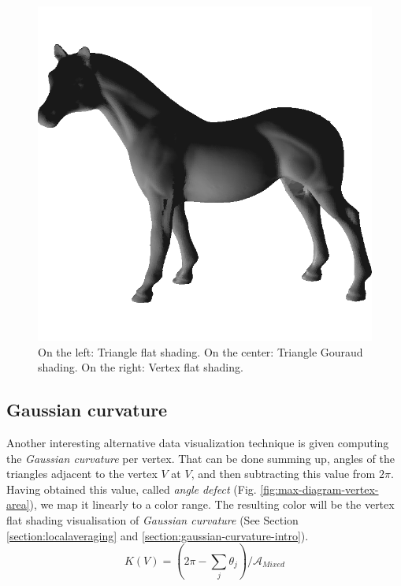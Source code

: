 \begin{figure}[!h]
    \endminipage\hfill
    \centering
    \includegraphics[scale=0.39]{images/horse-efs.png}
    \endminipage\hfill
    \caption{On the left: Triangle flat shading. On the center: Triangle Gouraud shading. On the right: Vertex flat shading.}
    \label{fig:comparison-fs-efs-gs}
\end{figure}

\subsection{Gaussian curvature}
\label{section:vertex-area-gaussian-curvature}
Another interesting alternative data visualization technique is given computing the \textit{Gaussian curvature} per vertex. That can be done summing up, angles of the triangles adjacent to the vertex $V$ at $V$, and then subtracting this value from $2\pi$.
Having obtained this value, called \textit{angle defect} (Fig. \ref{fig:max-diagram-vertex-area}), we map it linearly to a color range.
The resulting color will be the vertex flat shading visualisation of \textit{Gaussian curvature} (See Section \ref{section:localaveraging} and \ref{section:gaussian-curvature-intro}).
$$K(V) = (2\pi - \sum_j \theta_j)/\mathcal{A}_{Mixed}$$


